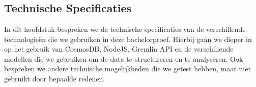 \chapter{}%
\label{ch:stand-van-zaken}






\section{Technische Specificaties}
In dit hoofdstuk bespreken we de technische specificaties van de verschillende technologieën die we gebruiken in deze bachelorproef.
Hierbij gaan we dieper in op het gebruik van CosmosDB, NodeJS, Gremlin API en de verschillende modellen die we gebruiken om de data te structureren en te analyseren.
Ook bespreken we andere technische mogelijkheden die we getest hebben, maar niet gebruikt door bepaalde redenen. 


